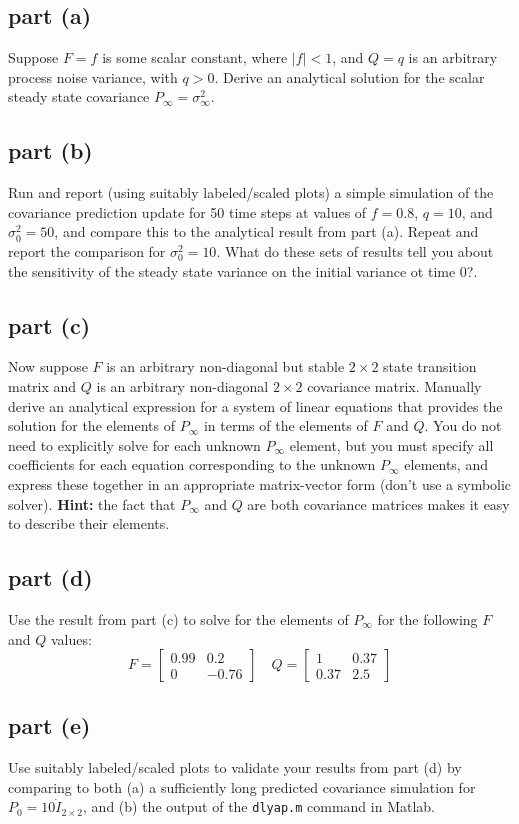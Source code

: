 \documentclass[11pt]{article}
\begin{document}
\subsection*{part (a)}
Suppose $F=f$ is some scalar constant, where $|f|<1$, and $Q=q$ is an arbitrary process noise variance, with $q>0$. Derive an analytical solution for the scalar steady state covariance $P_\infty=\sigma_\infty^2$.

\subsection*{part (b)}
Run and report (using suitably labeled/scaled plots) a simple simulation of the covariance prediction update for 50 time steps at values of $f=0.8$, $q=10$, and $\sigma_0^2=50$, and compare this to the analytical result from part (a). Repeat and report the comparison for $\sigma_0^2=10$. What do these sets of results tell you about the sensitivity of the steady state variance on the initial variance ot time 0?.

\subsection*{part (c)}
Now suppose $F$ is an arbitrary non-diagonal but stable $2\times2$ state transition matrix and $Q$ is an arbitrary non-diagonal $2\times2$ covariance matrix. Manually derive an analytical expression for a system of linear equations that provides the solution for the elements of $P_\infty$ in terms of the elements of $F$ and $Q$. You do not need to explicitly solve for each unknown $P_\infty$ element, but you must specify all coefficients for each equation corresponding to the unknown $P_\infty$ elements, and express these together in an appropriate matrix-vector form (don't use a symbolic solver). \textbf{Hint:} the fact that $P_\infty$ and $Q$ are both covariance matrices makes it easy to describe their elements.

\subsection*{part (d)}
Use the result from part (c) to solve for the elements of $P_\infty$ for the following $F$ and $Q$ values:
\begin{equation*}
	F=\begin{bmatrix} 0.99&0.2\\0&-0.76 \end{bmatrix}\quad Q=\begin{bmatrix} 1&0.37\\0.37&2.5 \end{bmatrix}
\end{equation*}

\subsection*{part (e)}
Use suitably labeled/scaled plots to validate your results from part (d) by comparing to both (a) a sufficiently long predicted covariance simulation for $P_0=10\dot I_{2\times 2}$, and (b) the output of the \texttt{dlyap.m} command in Matlab.
\end{document}
